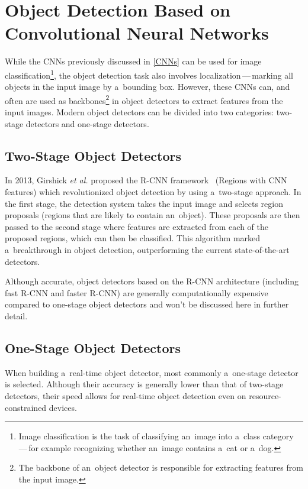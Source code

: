 \section{Object Detection Based on Convolutional Neural Networks}

While the CNNs previously discussed in \autoref{CNNs} can be used for image
classification\footnote{Image classification is the task of classifying an~image
into a~class category\,---\,for example recognizing whether an~image contains
a~cat or a~dog.}, the object detection task also involves
localization\,---\,marking all objects in the input image by a~bounding box.
However, these CNNs can, and often are used as backbones\footnote{The backbone
of an~object detector is responsible for extracting features from the input
image.} in object detectors to extract features from the input images. Modern
object detectors can be divided into two categories: two-stage detectors and
one-stage detectors.


\subsection{Two-Stage Object Detectors}

In 2013, Girshick \textit{et al.} proposed the R-CNN
framework~\cite{Girshick2013} (Regions with CNN features) which revolutionized
object detection by using a~two-stage approach. In the first stage, the
detection system takes the input image and selects region proposals (regions
that are likely to contain an~object). These proposals are then passed to the
second stage where features are extracted from each of the proposed regions,
which can then be classified. This algorithm marked a~breakthrough in object
detection, outperforming the current state-of-the-art detectors.

Although accurate, object detectors based on the R-CNN architecture (including
fast R-CNN and faster R-CNN) are generally computationally expensive compared to
one-stage object detectors and won't be discussed here in further detail.


\subsection{One-Stage Object Detectors}

When building a~real-time object detector, most commonly a~one-stage detector is
selected. Although their accuracy is generally lower than that of two-stage
detectors, their speed allows for real-time object detection even on
resource-constrained devices.


